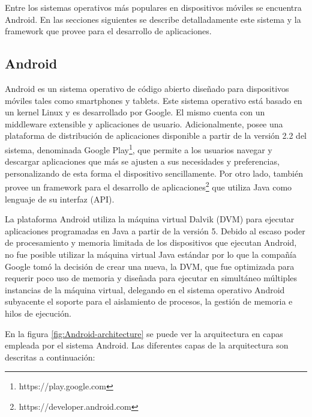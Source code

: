 Entre los sistemas operativos más populares en dispositivos móviles
se encuentra Android. En las secciones siguientes se describe detalladamente
este sistema y la framework que provee para el desarrollo de aplicaciones. 


\subsection{Android \label{sec:Android}}

Android es un sistema operativo de código abierto diseñado para dispositivos
móviles tales como smartphones y tablets. Este sistema operativo está
basado en un kernel Linux y es desarrollado por Google. El mismo cuenta
con un middleware extensible y aplicaciones de usuario. Adicionalmente,
posee una plataforma de distribución de aplicaciones disponible a
partir de la versión 2.2 del sistema, denominada Google Play\footnote{https://play.google.com},
que permite a los usuarios navegar y descargar aplicaciones que más
se ajusten a sus necesidades y preferencias, personalizando de esta
forma el dispositivo sencillamente. Por otro lado, también provee
un framework para el desarrollo de aplicaciones\footnote{https://developer.android.com}
que utiliza Java como lenguaje de su interfaz (API). 

La plataforma Android utiliza la máquina virtual Dalvik (\ac{DVM})
para ejecutar aplicaciones programadas en Java a partir de la versión
5. Debido al escaso poder de procesamiento y memoria limitada de los
dispositivos que ejecutan Android, no fue posible utilizar la máquina
virtual Java estándar por lo que la compañía Google tomó la decisión
de crear una nueva, la \ac{DVM}, que fue optimizada para requerir
poco uso de memoria y diseñada para ejecutar en simultáneo múltiples
instancias de la máquina virtual, delegando en el sistema operativo
Android subyacente el soporte para el aislamiento de procesos, la
gestión de memoria e hilos de ejecución. 

En la figura \ref{fig:Android-architecture} se puede ver la arquitectura
en capas empleada por el sistema Android. Las diferentes capas de
la arquitectura son descritas a continuación:

